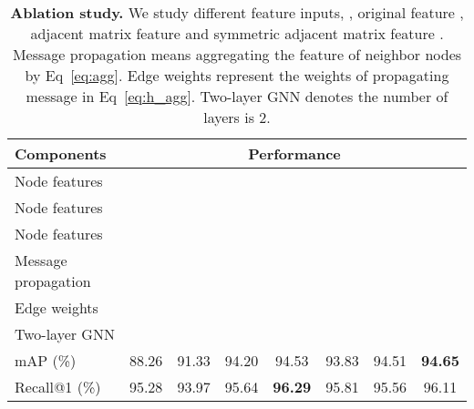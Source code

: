 \documentclass[10pt,twocolumn,letterpaper]{article}
\begin{document}
\begin{table}
\begin{center}
{
\small
\setlength{\tabcolsep}{1pt}
\begin{tabular}{l|ccccccc}
\toprule[1pt]
Components & \multicolumn{7}{c}{Performance} \\
\hline
Node features  &  & &  &  &  & &\\
Node features  & & & & & &&\\
Node features  &  & &  &  & & &\\
Message propagation & & &   &  &  & &\\
Edge weights  & & & &   &   & &\\ 
Two-layer GNN  & & & & &&  & \\
\hline
mAP (\%) & 88.26 & 91.33 & 94.20 &  94.53 &93.83& 94.51 &  \textbf{94.65}\\
Recall@1 (\%) & 95.28 & 93.97 & 95.64 &\textbf{96.29} & 95.81 & 95.56 & 96.11 \\
\bottomrule[1pt]
\end{tabular}}
\end{center}
\caption{ \textbf{Ablation study.} We study different feature inputs, \ie, original feature , adjacent matrix feature  and symmetric adjacent matrix feature . Message propagation means aggregating the feature of neighbor nodes by Eq~\ref{eq:agg}. Edge weights represent the weights of propagating message in Eq~\ref{eq:h_agg}. Two-layer GNN denotes the number of layers is 2.} 
\label{table:ablation}
\end{table}
\end{document}
